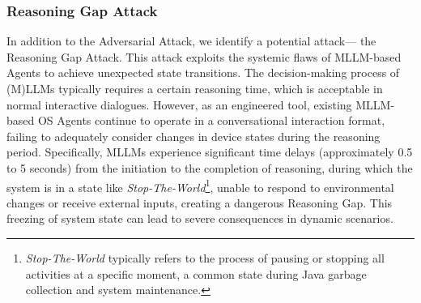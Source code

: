 \subsubsection{Reasoning Gap Attack}
\label{sec:reasoning_gap_attack}

In addition to the Adversarial Attack, we identify a potential attack— the Reasoning Gap Attack. This attack exploits the systemic flaws of MLLM-based Agents to achieve unexpected state transitions. The decision-making process of (M)LLMs typically requires a certain reasoning time, which is acceptable in normal interactive dialogues. However, as an engineered tool, existing MLLM-based OS Agents continue to operate in a conversational interaction format, failing to adequately consider changes in device states during the reasoning period. Specifically, MLLMs experience significant time delays (approximately 0.5 to 5 seconds) from the initiation to the completion of reasoning, during which the system is in a state like \textit{Stop-The-World}\footnote{\textit{Stop-The-World} typically refers to the process of pausing or stopping all activities at a specific moment, a common state during Java garbage collection and system maintenance.}, unable to respond to environmental changes or receive external inputs, creating a dangerous Reasoning Gap. This freezing of system state can lead to severe consequences in dynamic scenarios.

